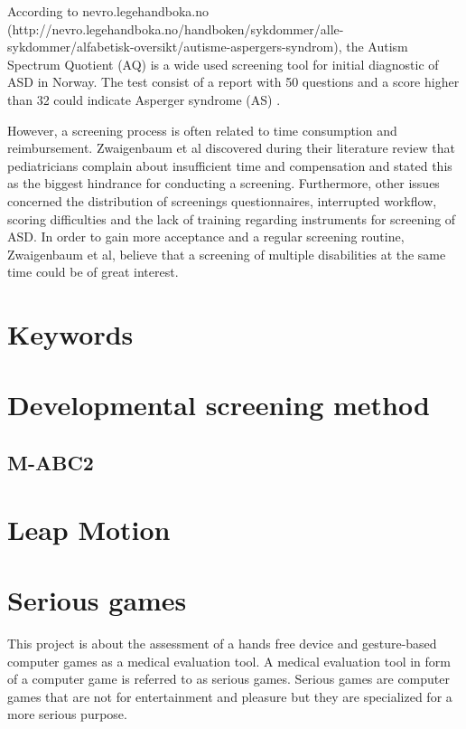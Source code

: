 According to nevro.legehandboka.no (http://nevro.legehandboka.no/handboken/sykdommer/alle-sykdommer/alfabetisk-oversikt/autisme-aspergers-syndrom), the Autism Spectrum Quotient (AQ) is a wide used screening tool for initial diagnostic of ASD in Norway. The test consist of a report with 50 questions and a score higher than 32 could indicate Asperger syndrome (AS) .

However, a screening process is often related to time consumption and reimbursement. Zwaigenbaum et al discovered during their literature review that pediatricians complain about insufficient time and compensation and stated this as the biggest hindrance for conducting a screening. Furthermore, other issues concerned the distribution of screenings questionnaires, interrupted workflow, scoring difficulties and the lack of training regarding instruments for  screening of ASD. In order to gain more acceptance and a regular screening routine, Zwaigenbaum et al, believe that a  screening of multiple disabilities at the same time could be of great interest.



\section{Keywords}
\label{sec:keywords}


\section{Developmental screening method}
\label{sec:screeningmethod}
\subsection{M-ABC2}
\section{Leap Motion}
\label{sec:leapmotion}
\section{Serious games}
\label{sec:seriousgames}
This project is about the assessment of a hands free device and gesture-based computer games as a medical evaluation tool. A medical evaluation tool in form of a computer game is referred to as serious games. Serious games are computer games that are not for entertainment and pleasure but they are specialized for a more serious purpose. 

